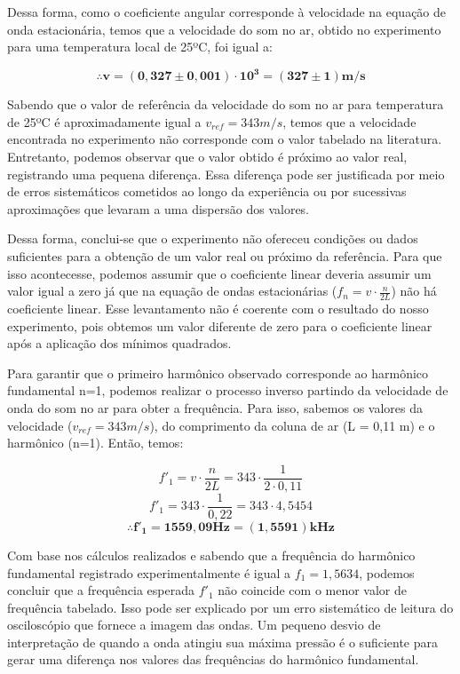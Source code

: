 Dessa forma, como o coeficiente angular corresponde à velocidade na equação de onda estacionária, temos que a velocidade do som no ar, obtido no experimento para uma temperatura local de 25ºC, foi igual a:

\[ \mathbf{\therefore v = (0,327 \pm 0,001) \cdot 10^3 = (327 \pm 1) m/s} \] 

Sabendo que o valor de referência da velocidade do som no ar para temperatura de 25ºC é aproximadamente igual a $v_{ref}= 343 m/s$, temos que a velocidade encontrada no experimento não corresponde com o valor tabelado na literatura. Entretanto, podemos observar que o valor obtido é próximo ao valor real, registrando uma pequena diferença. Essa diferença pode ser justificada por meio de erros sistemáticos cometidos ao longo da experiência ou por sucessivas aproximações que levaram a uma dispersão dos valores.

Dessa forma, conclui-se que o experimento não ofereceu condições ou dados suficientes para a obtenção de um valor real ou próximo da referência. Para que isso acontecesse, podemos assumir que o coeficiente linear deveria assumir um valor igual a zero já que na equação de ondas estacionárias ($f_n = v \cdot \frac{n}{2L}$) não há coeficiente linear. Esse levantamento não é coerente com o resultado do nosso experimento, pois obtemos um valor diferente de zero para o coeficiente linear após a aplicação dos mínimos quadrados.

Para garantir que o primeiro harmônico observado corresponde ao harmônico fundamental n=1, podemos realizar o processo inverso partindo da velocidade de onda do som no ar para obter a frequência. Para isso, sabemos os valores da velocidade ($v_{ref} = 343 m/s$), do comprimento da coluna de ar (L = 0,11 m) e o harmônico (n=1). Então, temos:

\[  f'_1 = v \cdot \frac{n}{2L} = 343 \cdot \frac{1}{2 \cdot 0,11} \]
\[  f'_1 = 343 \cdot \frac{1}{0,22} = 343 \cdot 4,5454 \]
\[  \mathbf{\therefore f'_1 = 1559,09 Hz = (1,5591) kHz} \]

Com base nos cálculos realizados e sabendo que a frequência do harmônico fundamental registrado experimentalmente é igual a $f_1 = 1,5634$, podemos concluir que a frequência esperada $f'_1$ não coincide com o menor valor de frequência tabelado. Isso pode ser explicado por um erro sistemático de leitura do osciloscópio que fornece a imagem das ondas. Um pequeno desvio de interpretação de quando a onda atingiu sua máxima pressão é o suficiente para gerar uma diferença nos valores das frequências do harmônico fundamental.
